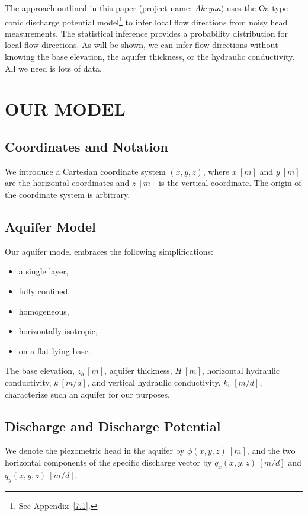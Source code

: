 \documentclass[12pt]{article}
\newcommand{\Oneka}{{\textsf{O\raisebox{-0.3ex}{n}\raisebox{0.3ex}{e}\raisebox{-0.3ex}{k}a}}}
\begin{document}
The approach outlined in this paper (project name: {\em Akeyaa}) uses the \Oneka-type conic discharge potential model\footnote{See Appendix~\ref{7.1}.} to infer local flow directions from noisy head measurements. The statistical inference provides a probability distribution for local flow directions. As will be shown, we can infer flow directions without knowing the base elevation, the aquifer thickness, or the hydraulic conductivity. All we need is lots of data.


\section{OUR MODEL}
\subsection{Coordinates and Notation}\label{2.1}
We introduce a Cartesian coordinate system $(x,y,z)$, where $x~[m]$ and $y~[m]$ are the horizontal coordinates and $z~[m]$ is the vertical coordinate. The origin of the coordinate system is arbitrary.

\subsection{Aquifer Model}\label{2.2}
Our aquifer model embraces the following simplifications:
%
\begin{itemize}
    \item a single layer,
    \item fully confined,
    \item homogeneous,
    \item horizontally isotropic,
    \item on a flat-lying base.
\end{itemize}
%
The base elevation, $z_b~[m]$, aquifer thickness, $H~[m]$, horizontal hydraulic conductivity, $k~[m/d]$, and vertical hydraulic conductivity, $k_v~[m/d]$, characterize such an aquifer for our purposes.

\subsection{Discharge and Discharge Potential}\label{2.3}
We denote the piezometric head in the aquifer by $\phi(x,y,z)~[m]$, and the two horizontal components of the specific discharge vector by $q_x(x,y,z)~[m/d]$ and $q_y(x,y,z)~[m/d]$.
\end{document}
